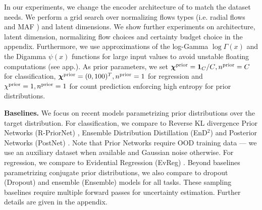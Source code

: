 In our experiments, we change the encoder architecture of \NatPNacro{} to match the dataset needs. We perform a grid search over normalizing flows types (i.e. radial flows \citep{radialflow} and MAF \citep{made,maf}) and latent dimensions. We show further experiments on architecture, latent dimension, normalizing flow choices and certainty budget choice in the appendix. Furthermore, we use approximations of the log-Gamma $\log\Gamma(x)$ and the Digamma $\psi(x)$ functions for large input values to avoid unstable floating computations (see app.). As prior parameters, we set ${\bm{\chi}^\text{prior}=\bm{1}_{C}/C}, {n^\text{prior}=C}$ for classification, ${\bm{\chi}^\text{prior}=(0, 100)^T}, n^\text{prior}=1$ for regression and $\chi^\text{prior}=1, n^\text{prior}=1$ for count prediction enforcing high entropy for prior distributions.

\textbf{Baselines.} We focus on recent models parametrizing prior distributions over the target distribution. For classification, we compare \NatPNacro{} to Reverse KL divergence Prior Networks (R-PriorNet) \citep{reverse-kl}, Ensemble Distribution Distillation (EnD$^2$) \citep{distribution-distillation} and Posterior Networks (PostNet) \citep{postnet}. Note that Prior Networks require OOD training data --- we use an auxiliary dataset when available and Gaussian noise otherwise. For regression, we compare to Evidential Regression (EvReg) \citep{evidential-regression}. Beyond baselines parametrizing conjugate prior distributions, we also compare to dropout (Dropout) \citep{dropout} and ensemble (Ensemble) \citep{ensembles} models for all tasks. These sampling baselines require multiple forward passes for uncertainty estimation. 
Further details are given in the appendix.


